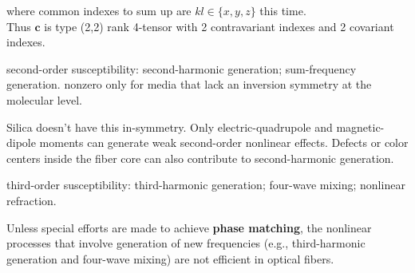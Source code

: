 \documentclass[12pt]{extarticle}
\numberwithin{equation}{section}
\numberwithin{figure}{section}
\numberwithin{table}{section}
\newcommand{\<}{\langle}
\renewcommand{\>}{\rangle}
\theoremstyle{definition}
\newcommand{\SubItem}[1]{
    {\setlength\itemindent{15pt} \item[-] #1}
}
\begin{document}
\begin{itemize}
{\begin{itemize}
                            where common indexes to sum up are $ kl \in \{x,y,z\} $ this time. \\
                            Thus $\boldsymbol{c}$ is type (2,2) rank 4-tensor with 2 contravariant indexes and 2 covariant indexes.
                    \end{itemize}
                }
            \item second-order susceptibility: second-harmonic generation; sum-frequency generation. nonzero only for media that lack an inversion symmetry at the molecular level. 
                \SubItem{Silica doesn't have this in-symmetry. Only electric-quadrupole and magnetic-dipole moments can generate weak second-order nonlinear effects. Defects or color centers inside the fiber core can also contribute to second-harmonic generation.}
            \item third-order susceptibility: third-harmonic generation; four-wave mixing; nonlinear refraction.
                \SubItem{Unless special efforts are made to achieve \textbf{phase matching}, the nonlinear processes that involve generation of new frequencies (e.g., third-harmonic generation and four-wave mixing) are not efficient in optical fibers.\label{Why nonlinear refraction most important} }
        \end{itemize}
        
\end{document}
